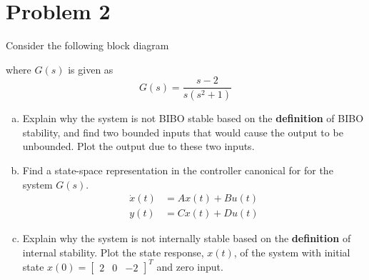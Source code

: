 \documentclass{article}
\begin{document}
\section*{Problem 2}
Consider the following block diagram
\begin{figure}[!htb]
\centering
{}
\end{figure}
where $G(s)$ is given as
$$ G(s) = \frac{s-2}{s(s^2+1)} $$
\begin{enumerate}[(a)]
\item Explain why the system is not BIBO stable based on the \textbf{definition} of BIBO stability, and find two bounded inputs that would cause the output to be unbounded.
Plot the output due to these two inputs.
\newline
\newline

\item Find a state-space representation in the controller canonical for for the system $G(s)$.
\begin{align*}
\dot{x}(t) &= Ax(t) + Bu(t) \\
y(t) &= Cx(t) + Du(t)
\end{align*}
\newline

\item Explain why the system is not internally stable based on the \textbf{definition} of internal stability.
Plot the state response, $x(t)$, of the system with initial state $x(0) = \begin{bmatrix}2 & 0 & -2 \end{bmatrix}^T$ and zero input.
\newline
\newline

\end{enumerate}
\end{document}
